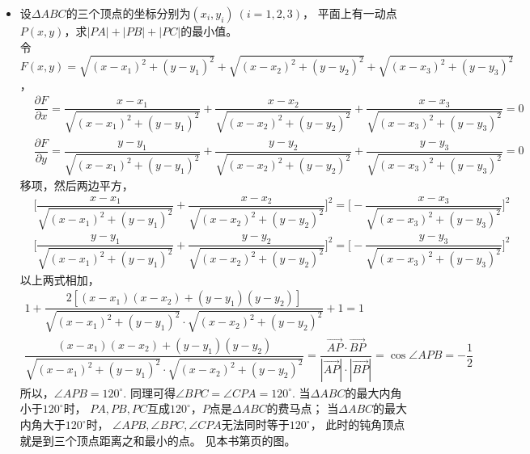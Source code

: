 \begin{itemize}[leftmargin=\inteval{\myitemleftmargin}pt,itemsep=
   \inteval{\myitemitempsep}pt,topsep=\inteval{\myitemtopsep}pt]
\item 设$ \Delta ABC $的三个顶点的坐标分别为$ (x_i,y_i)\ (i=1,2,3) $，
平面上有一动点$ P(x,y) $，求$ |PA|+|PB|+|PC| $的最小值。\label{费马点求偏导} \\
令$ F(x,y)=\sqrt{(x-x_1)^2+(y-y_1)^2}+\sqrt{(x-x_2)^2+(y-y_2)^2}+
\sqrt{(x-x_3)^2+(y-y_3)^2} $，
\begin{align*}
    &\dfrac{\partial F}{\partial x}=\dfrac{x-x_1}{\sqrt{(x-x_1)^2+(y-y_1)^2}}
    +\dfrac{x-x_2}{\sqrt{(x-x_2)^2+(y-y_2)^2}}+
    \dfrac{x-x_3}{\sqrt{(x-x_3)^2+(y-y_3)^2}}=0 \\
    &\dfrac{\partial F}{\partial y}=\dfrac{y-y_1}{\sqrt{(x-x_1)^2+(y-y_1)^2}}
    +\dfrac{y-y_2}{\sqrt{(x-x_2)^2+(y-y_2)^2}}+
    \dfrac{y-y_3}{\sqrt{(x-x_3)^2+(y-y_3)^2}}=0 
\end{align*}
移项，然后两边平方，
\begin{align*}
    & \Big[\dfrac{x-x_1}{\sqrt{(x-x_1)^2+(y-y_1)^2}}
    +\dfrac{x-x_2}{\sqrt{(x-x_2)^2+(y-y_2)^2}}\Big]^2=
    \Big[-\dfrac{x-x_3}{\sqrt{(x-x_3)^2+(y-y_3)^2}}\Big]^2 \\
    & \Big[\dfrac{y-y_1}{\sqrt{(x-x_1)^2+(y-y_1)^2}}
    +\dfrac{y-y_2}{\sqrt{(x-x_2)^2+(y-y_2)^2}}\Big]^2=
    \Big[-\dfrac{y-y_3}{\sqrt{(x-x_3)^2+(y-y_3)^2}}\Big]^2    
\end{align*}
以上两式相加，
\begin{gather*}
    1+\dfrac{2[(x-x_1)(x-x_2)+(y-y_1)(y-y_2)]}{\sqrt{(x-x_1)^2
            +(y-y_1)^2}\cdot \sqrt{(x-x_2)^2+(y-y_2)^2}}+1=1 \\
    \dfrac{(x-x_1)(x-x_2)+(y-y_1)(y-y_2)}{\sqrt{(x-x_1)^2
            +(y-y_1)^2}\cdot \sqrt{(x-x_2)^2+(y-y_2)^2}}=
    \dfrac{\vec{AP}\cdot \vec{BP}}{|\vec{AP}|\cdot|\vec{BP}|}=
    \cos\angle APB=-\dfrac{1}{2}
\end{gather*}
所以，$ \angle APB=120^{\circ} $. 同理可得$ \angle BPC=\angle CPA
=120^{\circ} $. 当$ \Delta ABC $的最大内角小于$ 120^{\circ} $时，
$ PA,PB,PC $互成$ 120^{\circ} $，$ P $点是$ \Delta ABC $的费马点；
当$ \Delta ABC $的最大内角大于$ 120^{\circ} $时，
$ \angle APB,\angle BPC,\angle CPA $无法同时等于$ 120^{\circ} $，
此时的钝角顶点就是到三个顶点距离之和最小的点。
见本书第\pageref{费马点朝内朝外两种}页的图。


\end{itemize}
